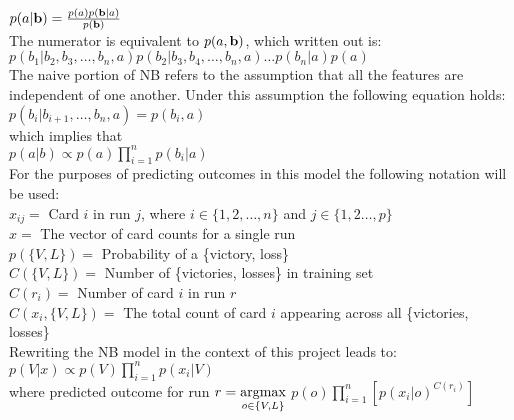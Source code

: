 \documentclass[10pt, a4paper, twocolumn]{article}
\begin{document}
$p(a|\textbf b) = \frac{p(a)p(\textbf b|a)}{p(\textbf b)}$\\

The numerator is equivalent to $p(a,\textbf b)$, which written out is:\\

$ p(b_1|b_2, b_3, \ldots, b_n, a) p(b_2|b_3, b_4, \ldots, b_n, a)\ldots p(b_n|a) p(a)$\\

The naive portion of NB refers to the assumption that all the features are independent of one another.  Under this assumption the following equation holds: \\

$p(b_i|b_{i+1}, …, b_n, a) = p(b_i, a)$\\

which implies that\\

$\displaystyle p(a|b) \propto p(a)\prod_{i=1}^n p(b_i|a)$\\

For the purposes of predicting outcomes in this model the following notation will be used:\\

$x_{ij} =$ Card $i$ in run $j$, where $i \in \{1, 2, \ldots , n\}$ and $j \in \{1, 2\ldots, p\}$\\

$x =$ The vector of card counts for a single run\\

$p(\{V, L\}) =$ Probability of a \{victory, loss\}\\

$C(\{V,L\}) =$ Number of \{victories, losses\} in training set\\

$C(r_i) =$ Number of card $i$ in run $r$\\

$C(x_i, \{V,L \}) =$ The total count of card $i$ appearing across all \{victories, losses\}\\

Rewriting the NB model in the context of this project leads to:\\

$p(V|x) \propto p(V) \prod_{i=1}^n p(x_i |V)$\\

where predicted outcome for run $r = \\ \underset{o\in\{V,L\}}{\mathrm{argmax}}$  $p(o) \displaystyle\prod_{i=1}^n[p(x_i |o)^{ C(r_i)} ] $\\
\end{document}
